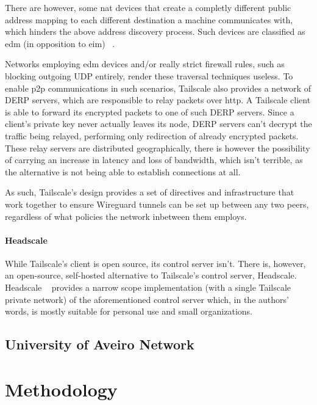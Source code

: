 \documentclass[11pt,twoside,a4paper]{report}
\begin{document}
There are however, some \acrshort{nat} devices that create a completly different public address mapping to each different destination a machine communicates with, which hinders the above address discovery process. Such devices are classified as \acrfull{edm} (in opposition to \acrfull{eim}) ~\cite{rfc4787}.

Networks employing \acrshort{edm} devices and/or really strict firewall rules, such as blocking outgoing UDP entirely, render these traversal techniques useless. To enable \acrshort{p2p} communications in such scenarios, Tailscale also provides a network of \acrfull{DERP} servers, which are responsible to relay packets over \acrshort{http}. A Tailscale client is able to forward its encrypted packets to one of such \acrshort{DERP} servers. Since a client's private key never actually leaves its node, \acrshort{DERP} servers can't decrypt the traffic being relayed, performing only redirection of already encrypted packets. These relay servers are distributed geographically, there is however the possibility of carrying an increase in latency and loss of bandwidth, which isn't terrible, as the alternative is not being able to establish connections at all.

As such, Tailscale's design provides a set of directives and infrastructure that work together to ensure Wireguard tunnels can be set up between any two peers, regardless of what policies the network inbetween them employs.

\subsubsection{Headscale}

While Tailscale's client is open source, its control server isn't. There is, however, an open-source, self-hosted alternative to Tailscale's control server, Headscale. Headscale ~\cite{headscale2023online} provides a narrow scope implementation (with a single Tailscale private network) of the aforementioned control server which, in the authors' words, is mostly suitable for personal use and small organizations.


\section{University of Aveiro Network}

\chapter{Methodology}
\label{chapter:method}
\end{document}
